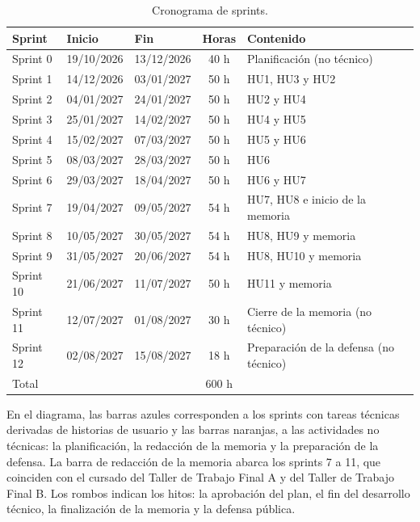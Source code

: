 \documentclass[
11pt, %
]{charter}
\begin{document}
\begin{table}[H]
\centering
\caption{Cronograma de sprints.}
\label{tab:cronograma}
\begin{tabularx}{\linewidth}{@{}|l|l|l|c|X|@{}}
\hline
\rowcolor[HTML]{C0C0C0}
Sprint & Inicio & Fin & Horas & Contenido \\ \hline
Sprint 0 & 19/10/2026 & 13/12/2026 & 40 h & Planificación (no técnico) \\ \hline
Sprint 1 & 14/12/2026 & 03/01/2027 & 50 h & HU1, HU3 y HU2 \\ \hline
Sprint 2 & 04/01/2027 & 24/01/2027 & 50 h & HU2 y HU4 \\ \hline
Sprint 3 & 25/01/2027 & 14/02/2027 & 50 h & HU4 y HU5 \\ \hline
Sprint 4 & 15/02/2027 & 07/03/2027 & 50 h & HU5 y HU6 \\ \hline
Sprint 5 & 08/03/2027 & 28/03/2027 & 50 h & HU6 \\ \hline
Sprint 6 & 29/03/2027 & 18/04/2027 & 50 h & HU6 y HU7 \\ \hline
Sprint 7 & 19/04/2027 & 09/05/2027 & 54 h & HU7, HU8 e inicio de la memoria \\ \hline
Sprint 8 & 10/05/2027 & 30/05/2027 & 54 h & HU8, HU9 y memoria \\ \hline
Sprint 9 & 31/05/2027 & 20/06/2027 & 54 h & HU8, HU10 y memoria \\ \hline
Sprint 10 & 21/06/2027 & 11/07/2027 & 50 h & HU11 y memoria \\ \hline
Sprint 11 & 12/07/2027 & 01/08/2027 & 30 h & Cierre de la memoria (no técnico) \\ \hline
Sprint 12 & 02/08/2027 & 15/08/2027 & 18 h & Preparación de la defensa (no técnico) \\ \hline
\multicolumn{3}{|l|}{Total} & 600 h & \\ \hline
\end{tabularx}
\end{table}

En el diagrama, las barras azules corresponden a los sprints con tareas técnicas derivadas de historias de usuario y las barras naranjas, a las actividades no técnicas: la planificación, la redacción de la memoria y la preparación de la defensa. La barra de redacción de la memoria abarca los sprints 7 a 11, que coinciden con el cursado del Taller de Trabajo Final A y del Taller de Trabajo Final B. Los rombos indican los hitos: la aprobación del plan, el fin del desarrollo técnico, la finalización de la memoria y la defensa pública.
\end{document}
